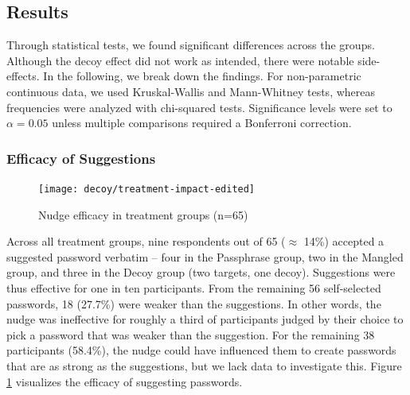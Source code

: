 

\subsection{Results}
Through statistical tests, we found significant differences across the groups. Although the decoy effect did not work as intended, there were notable side-effects. In the following, we break down the findings. For non-parametric continuous data, we used Kruskal-Wallis and Mann-Whitney tests, whereas frequencies were analyzed with chi-squared tests. Significance levels were set to $\alpha = 0.05$ unless multiple comparisons required a Bonferroni correction. 

\subsubsection{Efficacy of Suggestions} 
\begin{figure}
	\centering
	\texttt{[image: decoy/treatment-impact-edited]}
	\caption{\label{fig:decoy:treatment-impact-edited} Nudge efficacy in treatment groups (n=65)}
\end{figure}
Across all treatment groups, nine respondents out of 65 ($\approx$ 14\%) accepted a suggested password verbatim -- four in the Passphrase group, two in the Mangled group, and three in the Decoy group (two targets, one decoy). Suggestions were thus effective for one in ten participants. From the remaining 56 self-selected passwords, 18 (27.7\%) were weaker than the suggestions. In other words, the nudge was ineffective for roughly a third of participants judged by their choice to pick a password that was weaker than the suggestion. For the remaining 38 participants (58.4\%), the nudge could have influenced them to create passwords that are as strong as the suggestions, but we lack data to investigate this. Figure \ref{fig:decoy:treatment-impact-edited} visualizes the efficacy of suggesting passwords.

